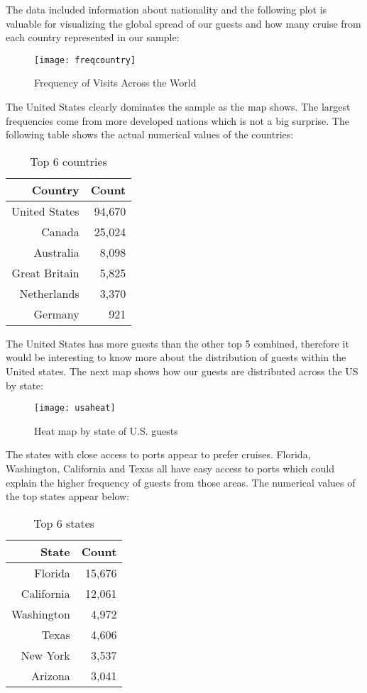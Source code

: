 \documentclass[twoside,twocolumn]{article}
\begin{document}
The data included information about nationality and the following plot is valuable for visualizing the global spread of our guests and how many cruise from each country represented in our sample:
\begin{figure}[H]
\texttt{[image: freqcountry]}
\caption{Frequency of Visits Across the World}
\end{figure}
The United States clearly dominates the sample as the map shows. The largest frequencies come from more developed nations which is not a big surprise. The following table shows the actual numerical values of the countries: 
\begin{table}[H]
	\centering
\begin{tabular}{r r}
	Country & Count \\
	\hline
	United States &  94,670 \\               
	Canada &  25,024 \\                
	Australia &   8,098 \\                
	Great Britain &  5,825 \\                 
	Netherlands &  3,370  \\
	Germany & 921 \\
\end{tabular}
\caption{Top 6 countries}
\end{table}
The United States has more guests than the other top 5 combined, therefore it would be interesting to know more about the distribution of guests within the United states. The next map shows how our guests are distributed across the US by state: 
\begin{figure}[H]
	\texttt{[image: usaheat]}
	\caption{Heat map by state of U.S. guests}
\end{figure}
The states with close access to ports appear to prefer cruises. Florida, Washington, California and Texas all have easy access to ports which could explain the higher frequency of guests from those areas. The numerical values of the top states appear below:
\begin{table}[H]
	\centering
	\begin{tabular}{rr}
		State & Count \\
		\hline 
Florida & 15,676 \\
California & 12,061 \\
Washington & 4,972 \\
Texas  & 4,606 \\
New York &  3,537 \\
 Arizona  & 3,041 \\
	\end{tabular}
	\caption{Top 6 states}
\end{table}
\end{document}

